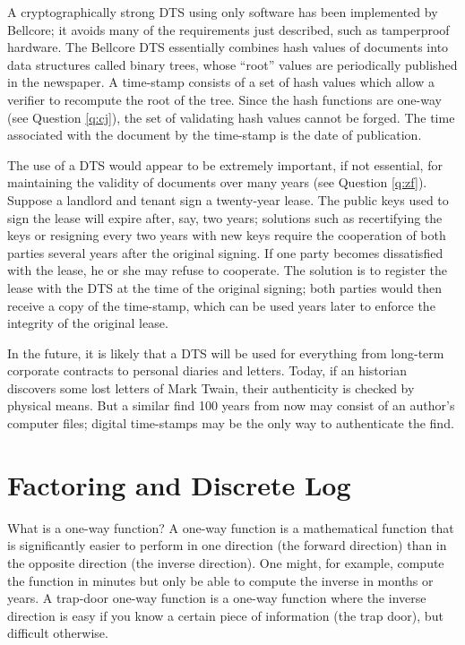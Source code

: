 A cryptographically strong DTS using only software \cite{bayer} 
has been implemented by Bellcore; it avoids many of the requirements 
just described, such as tamperproof hardware. The Bellcore DTS 
essentially combines hash values of documents into data structures 
called binary trees, whose ``root'' values are periodically published 
in the newspaper. A time-stamp consists of a set of hash values which 
allow a verifier to recompute the root of the tree. Since the hash 
functions are one-way (see Question \ref{q:cj}), the set of validating 
hash values cannot be forged. The time associated with the document by
the time-stamp is the date of publication.

The use of a DTS would appear to be extremely important, if not 
essential, for maintaining the validity of documents over many years 
(see Question \ref{q:zf}). Suppose a landlord and tenant sign a 
twenty-year lease. The public keys used to sign the lease will expire 
after, say, two years; solutions such as recertifying the keys or 
resigning every two years with new keys require the cooperation of 
both parties several years after the original signing. If one party 
becomes dissatisfied with the lease, he or she may refuse to cooperate. 
The solution is to register the lease with the DTS at the time of the 
original signing; both parties would then receive a copy of the 
time-stamp, which can be used years later to enforce the integrity of 
the original lease.

In the future, it is likely that a DTS will be used for everything
from long-term corporate contracts to personal diaries and letters.
Today, if an historian discovers some lost letters of Mark Twain, their
authenticity is checked by physical means. But a similar find 100 years
from now may consist of an author's computer files; digital time-stamps 
may be the only way to authenticate the find.

\section{Factoring and Discrete Log}
{What is a one-way function?}
A one-way function is a mathematical function that is significantly
easier to perform in one direction (the forward direction) than in the 
opposite direction (the inverse direction). One might, for example, 
compute the function in minutes but only be able to compute the inverse 
in months or years. A trap-door one-way function is a one-way function
where the inverse direction is easy if you know a certain piece of
information (the trap door), but difficult otherwise.

